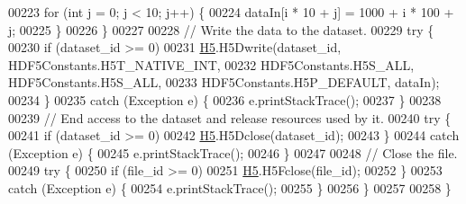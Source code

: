 \begin{DoxyCode}
00223             \textcolor{keywordflow}{for} (\textcolor{keywordtype}{int} j = 0; j < 10; j++) \{
00224                 dataIn[i * 10 + j] = 1000 + i * 100 + j;
00225             \}
00226         \}
00227 
00228         \textcolor{comment}{// Write the data to the dataset.}
00229         \textcolor{keywordflow}{try} \{
00230             \textcolor{keywordflow}{if} (dataset\_id >= 0)
00231                 \hyperlink{namespace_h5}{H5}.H5Dwrite(dataset\_id, HDF5Constants.H5T\_NATIVE\_INT,
00232                         HDF5Constants.H5S\_ALL, HDF5Constants.H5S\_ALL,
00233                         HDF5Constants.H5P\_DEFAULT, dataIn);
00234         \}
00235         \textcolor{keywordflow}{catch} (Exception e) \{
00236             e.printStackTrace();
00237         \}
00238 
00239         \textcolor{comment}{// End access to the dataset and release resources used by it.}
00240         \textcolor{keywordflow}{try} \{
00241             \textcolor{keywordflow}{if} (dataset\_id >= 0)
00242                 \hyperlink{namespace_h5}{H5}.H5Dclose(dataset\_id);
00243         \}
00244         \textcolor{keywordflow}{catch} (Exception e) \{
00245             e.printStackTrace();
00246         \}
00247 
00248         \textcolor{comment}{// Close the file.}
00249         \textcolor{keywordflow}{try} \{
00250             \textcolor{keywordflow}{if} (file\_id >= 0)
00251                 \hyperlink{namespace_h5}{H5}.H5Fclose(file\_id);
00252         \}
00253         \textcolor{keywordflow}{catch} (Exception e) \{
00254             e.printStackTrace();
00255         \}
00256     \}
00257 
00258 \}
\end{DoxyCode}
